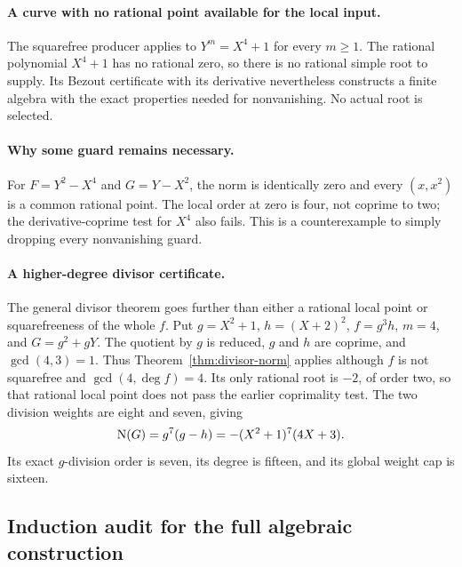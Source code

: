 \paragraph{A curve with no rational point available for the local input.}
The squarefree producer applies to $Y^m=X^4+1$ for every $m\ge1$. The rational polynomial $X^4+1$ has no rational zero, so there is no rational simple root to supply. Its Bezout certificate with its derivative nevertheless constructs a finite algebra with the exact properties needed for nonvanishing. No actual root is selected.

\paragraph{Why some guard remains necessary.}
For $F=Y^2-X^4$ and $G=Y-X^2$, the norm is identically zero and every $(x,x^2)$ is a common rational point. The local order at zero is four, not coprime to two; the derivative-coprime test for $X^4$ also fails. This is a counterexample to simply dropping every nonvanishing guard.

\paragraph{A higher-degree divisor certificate.}
The general divisor theorem goes further than either a rational local point or squarefreeness of the whole $f$. Put $g=X^2+1$, $h=(X+2)^2$, $f=g^3h$, $m=4$, and $G=g^2+gY$. The quotient by $g$ is reduced, $g$ and $h$ are coprime, and $\gcd(4,3)=1$. Thus Theorem~\ref{thm:divisor-norm} applies although $f$ is not squarefree and $\gcd(4,\deg f)=4$. Its only rational root is $-2$, of order two, so that rational local point does not pass the earlier coprimality test. The two division weights are eight and seven, giving
\[
 \operatorname{N}(G)=g^7(g-h)=-(X^2+1)^7(4X+3).
\]
Its exact $g$-division order is seven, its degree is fifteen, and its global weight cap is sixteen.

\subsection{Induction audit for the full algebraic construction}

